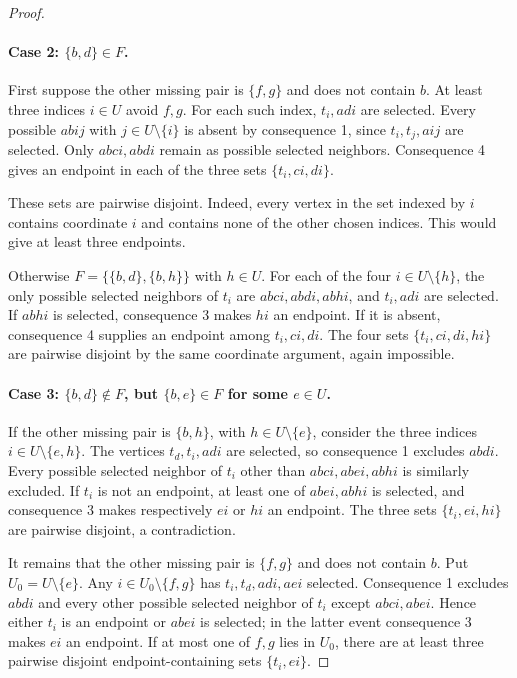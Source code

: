 \documentclass[11pt,a4paper]{article}
\theoremstyle{definition}
\theoremstyle{remark}
\begin{document}
\begin{proof}
\paragraph{Case 2: $\{b,d\}\in F$.}
First suppose the other missing pair is $\{f,g\}$ and does not contain $b$. At least three indices $i\in U$ avoid $f,g$. For each such index, $t_i,adi$ are selected. Every possible $abij$ with $j\in U\setminus\{i\}$ is absent by consequence 1, since $t_i,t_j,aij$ are selected. Only $abci,abdi$ remain as possible selected neighbors. Consequence 4 gives an endpoint in each of the three sets $\{t_i,ci,di\}$.

These sets are pairwise disjoint. Indeed, every vertex in the set indexed by $i$ contains coordinate $i$ and contains none of the other chosen indices. This would give at least three endpoints.

Otherwise $F=\{\{b,d\},\{b,h\}\}$ with $h\in U$. For each of the four $i\in U\setminus\{h\}$, the only possible selected neighbors of $t_i$ are $abci,abdi,abhi$, and $t_i,adi$ are selected. If $abhi$ is selected, consequence 3 makes $hi$ an endpoint. If it is absent, consequence 4 supplies an endpoint among $t_i,ci,di$. The four sets $\{t_i,ci,di,hi\}$ are pairwise disjoint by the same coordinate argument, again impossible.

\paragraph{Case 3: $\{b,d\}\notin F$, but $\{b,e\}\in F$ for some $e\in U$.}
If the other missing pair is $\{b,h\}$, with $h\in U\setminus\{e\}$, consider the three indices $i\in U\setminus\{e,h\}$. The vertices $t_d,t_i,adi$ are selected, so consequence 1 excludes $abdi$. Every possible selected neighbor of $t_i$ other than $abci,abei,abhi$ is similarly excluded. If $t_i$ is not an endpoint, at least one of $abei,abhi$ is selected, and consequence 3 makes respectively $ei$ or $hi$ an endpoint. The three sets $\{t_i,ei,hi\}$ are pairwise disjoint, a contradiction.

It remains that the other missing pair is $\{f,g\}$ and does not contain $b$. Put $U_0=U\setminus\{e\}$. Any $i\in U_0\setminus\{f,g\}$ has $t_i,t_d,adi,aei$ selected. Consequence 1 excludes $abdi$ and every other possible selected neighbor of $t_i$ except $abci,abei$. Hence either $t_i$ is an endpoint or $abei$ is selected; in the latter event consequence 3 makes $ei$ an endpoint. If at most one of $f,g$ lies in $U_0$, there are at least three pairwise disjoint endpoint-containing sets $\{t_i,ei\}$.


\end{proof}
\end{document}
